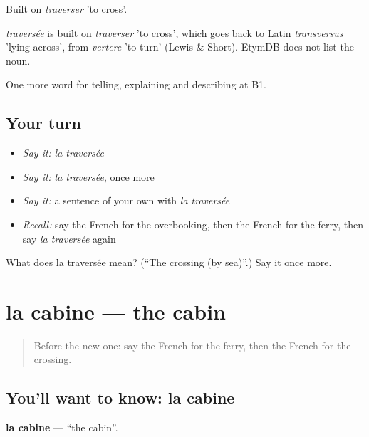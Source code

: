 Built on \emph{traverser} 'to cross'.

\begin{cousinweb}
\emph{traversée} is built on \emph{traverser} 'to cross', which goes back to Latin \emph{trānsversus} 'lying across', from \emph{vertere} 'to turn' (Lewis \& Short). EtymDB does not list the noun.
\end{cousinweb}

\begin{grammarlens}[title={What you've built}]
One more word for telling, explaining and describing at B1.
\end{grammarlens}

\subsection*{Your turn}
\begin{itemize}
\raggedright
  \item \emph{Say it:} \emph{la traversée}
  \item \emph{Say it:} \emph{la traversée}, once more
  \item \emph{Say it:} a sentence of your own with \emph{la traversée}
  \item \emph{Recall:} say the French for the overbooking, then the French for the ferry, then say \emph{la traversée} again
\end{itemize}

\begin{tcolorbox}[breakable,colback=teal!4,colframe=teal!35!black,title={Before you move on}]
What does la traversée mean? (\textquotedblleft{}The crossing (by sea)\textquotedblright{}.) Say it once more.
\end{tcolorbox}
\section[la cabine]{la cabine — the cabin}

\label{lesson:FR-C422-cabine}



\begin{quote}
Before the new one: say the French for the ferry, then the French for the crossing.
\end{quote}

\subsection*{You'll want to know: la cabine}
\textbf{la cabine} — \textquotedblleft{}the cabin\textquotedblright{}.

